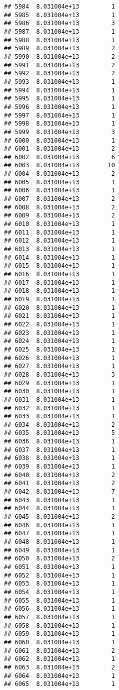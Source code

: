 \documentclass[
]{article}
\begin{document}
\begin{verbatim}
## 5984  8.031004e+13         1
## 5985  8.031004e+13         1
## 5986  8.031004e+13         3
## 5987  8.031004e+13         1
## 5988  8.031004e+13         1
## 5989  8.031004e+13         2
## 5990  8.031004e+13         2
## 5991  8.031004e+13         2
## 5992  8.031004e+13         2
## 5993  8.031004e+13         1
## 5994  8.031004e+13         1
## 5995  8.031004e+13         1
## 5996  8.031004e+13         1
## 5997  8.031004e+13         1
## 5998  8.031004e+13         1
## 5999  8.031004e+13         3
## 6000  8.031004e+13         1
## 6001  8.031004e+13         2
## 6002  8.031004e+13         6
## 6003  8.031004e+13        10
## 6004  8.031004e+13         2
## 6005  8.031004e+13         1
## 6006  8.031004e+13         1
## 6007  8.031004e+13         2
## 6008  8.031004e+13         2
## 6009  8.031004e+13         2
## 6010  8.031004e+13         1
## 6011  8.031004e+13         1
## 6012  8.031004e+13         1
## 6013  8.031004e+13         1
## 6014  8.031004e+13         1
## 6015  8.031004e+13         1
## 6016  8.031004e+13         1
## 6017  8.031004e+13         1
## 6018  8.031004e+13         1
## 6019  8.031004e+13         1
## 6020  8.031004e+13         1
## 6021  8.031004e+13         1
## 6022  8.031004e+13         1
## 6023  8.031004e+13         1
## 6024  8.031004e+13         1
## 6025  8.031004e+13         1
## 6026  8.031004e+13         1
## 6027  8.031004e+13         1
## 6028  8.031004e+13         3
## 6029  8.031004e+13         1
## 6030  8.031004e+13         1
## 6031  8.031004e+13         1
## 6032  8.031004e+13         1
## 6033  8.031004e+13         1
## 6034  8.031004e+13         2
## 6035  8.031004e+13         5
## 6036  8.031004e+13         1
## 6037  8.031004e+13         1
## 6038  8.031004e+13         1
## 6039  8.031004e+13         1
## 6040  8.031004e+13         2
## 6041  8.031004e+13         2
## 6042  8.031004e+13         7
## 6043  8.031004e+13         1
## 6044  8.031004e+13         1
## 6045  8.031004e+13         2
## 6046  8.031004e+13         1
## 6047  8.031004e+13         1
## 6048  8.031004e+13         1
## 6049  8.031004e+13         1
## 6050  8.031004e+13         2
## 6051  8.031004e+13         1
## 6052  8.031004e+13         1
## 6053  8.031004e+13         1
## 6054  8.031004e+13         1
## 6055  8.031004e+13         1
## 6056  8.031004e+13         1
## 6057  8.031004e+13         1
## 6058  8.031004e+13         1
## 6059  8.031004e+13         1
## 6060  8.031004e+13         1
## 6061  8.031004e+13         2
## 6062  8.031004e+13         1
## 6063  8.031004e+13         2
## 6064  8.031004e+13         1
## 6065  8.031004e+13         1

\end{verbatim}
\end{document}
